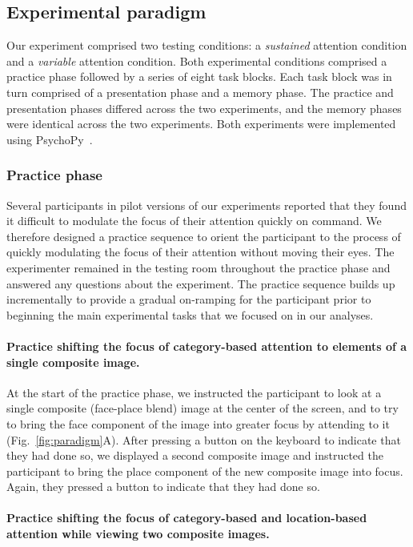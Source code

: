 \documentclass[english]{article}
\begin{document}
\subsection*{Experimental paradigm}

Our experiment comprised two testing conditions: a \textit{sustained} attention
condition and a \textit{variable} attention condition. Both experimental
conditions comprised a practice phase followed by a series of eight task
blocks. Each task block was in turn comprised of a presentation phase and a
memory phase. The practice and presentation phases differed across the two
experiments, and the memory phases were identical across the two experiments.
Both experiments were implemented using PsychoPy~\citep{PeirEtal19}.

\subsubsection*{Practice phase}

Several participants in pilot versions of our experiments reported that they
found it difficult to modulate the focus of their attention quickly on command.
We therefore designed a practice sequence to orient the participant to the
process of quickly modulating the focus of their attention without moving their
eyes. The experimenter remained in the testing room throughout the practice
phase and answered any questions about the experiment. The practice sequence
builds up incrementally to provide a gradual on-ramping for the participant
prior to beginning the main experimental tasks that we focused on in our
analyses.

\paragraph{Practice shifting the focus of category-based attention to elements
of a single composite image.}

At the start of the practice phase, we instructed the participant to look at a
single composite (face-place blend) image at the center of the screen, and to
try to bring the face component of the image into greater focus by attending to
it (Fig.~\ref{fig:paradigm}A). After pressing a button on the keyboard to
indicate that they had done so, we displayed a second composite image and
instructed the participant to bring the place component of the new composite
image into focus. Again, they pressed a button to indicate that they had done
so.

\paragraph{Practice shifting the focus of category-based and location-based
attention while viewing two composite images.}
\end{document}
